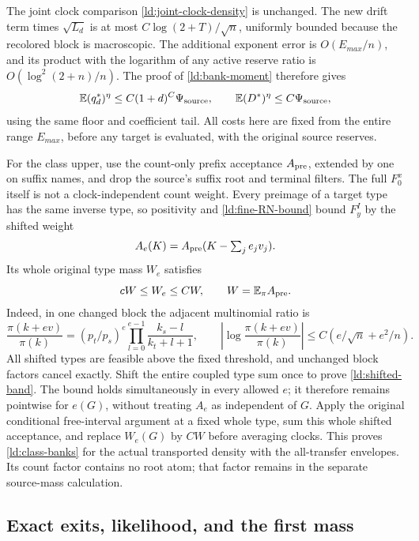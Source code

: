 The joint clock comparison \eqref{ld:joint-clock-density} is
unchanged.  The new drift term times \(\sqrt{L_d}\) is at most
\(C\log(2+T)/\sqrt n\), uniformly bounded because the recolored
block is macroscopic.  The additional exponent error is
\(O(E_{max}/n)\), and its product with the logarithm of any
active reserve ratio is \(O(\log^2(2+n)/n)\).  The proof of
\eqref{ld:bank-moment} therefore gives
\begin{equation}
 \mathbb E(q_d^*)^\eta\le C(1+d)^C\Psi_{\rm source},\qquad
 \mathbb E(D^*)^\eta\le C\Psi_{\rm source},
 \label{ld:all-e-moments}
\end{equation}
using the same floor and coefficient tail.  All costs here are fixed
from the entire range \(E_{max}\), before any target is evaluated,
with the original source reserves.

For the class upper, use the count-only prefix acceptance
\(A_{\rm pre}\), extended by one on suffix names, and drop the
source's suffix root and terminal filters.  The full \(F_0^x\)
itself is not a clock-independent count weight.  Every preimage of
a target type has the same inverse type, so positivity and
\eqref{ld:fine-RN-bound} bound \(F_y^I\) by the shifted weight
\[
 A_e(K)=A_{\rm pre}(K-\textstyle\sum_je_jv_j).
\]
Its whole original type mass \(W_e\) satisfies
\begin{equation}
 cW\le W_e\le CW,\qquad W=\mathbb E_\pi A_{\rm pre}.
 \label{ld:shifted-band}
\end{equation}
Indeed, in one changed block the adjacent multinomial ratio is
\[
 \frac{\pi(k+ev)}{\pi(k)}
 =(p_t/p_s)^e\prod_{l=0}^{e-1}\frac{k_s-l}{k_t+l+1},\qquad
 \left|\log\frac{\pi(k+ev)}{\pi(k)}\right|
       \le C(e/\sqrt n+e^2/n).
\]
All shifted types are feasible above the fixed threshold, and
unchanged block factors cancel exactly.  Shift the entire coupled
type sum once to prove \eqref{ld:shifted-band}.  The bound holds
simultaneously in every allowed \(e\); it therefore remains
pointwise for \(e(G)\), without treating \(A_e\) as independent
of \(G\).  Apply the original conditional free-interval argument
at a fixed whole type, sum this whole shifted acceptance, and
replace \(W_e(G)\) by \(CW\) before averaging clocks.  This proves
\eqref{ld:class-banks} for the actual transported density with the
all-transfer envelopes.  Its count factor contains no root atom;
that factor remains in the separate source-mass calculation.

\subsection{Exact exits, likelihood, and the first mass}

